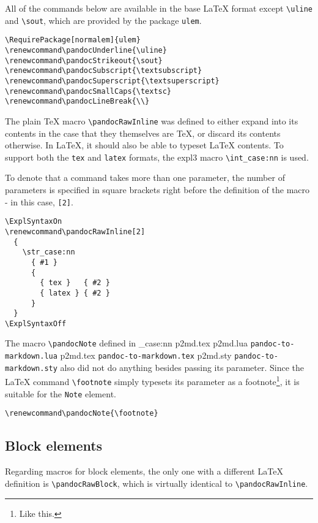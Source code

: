 \documentclass[
  digital,     %
  oneside,     %
  nosansbold,  %
  nocolorbold, %
  lof,         %
  nolot,       %
]{fithesis4}
\newcommand\macro[1]{\texttt{\textbackslash{}{#1}}}
\newcommand\file[1]
  {
    \str_case:nn
      { #1 }
      {
        { p2md.lua } { \texttt{pandoc\hyp{}to\hyp{}markdown.lua} }
        { p2md.tex } { \texttt{pandoc\hyp{}to\hyp{}markdown.tex} }
        { p2md.sty } { \texttt{pandoc\hyp{}to\hyp{}markdown.sty} }
      }
  }
\begin{document}
All of the commands below are available in the base \LaTeX{} format except \macro{uline} and \macro{sout}, which are provided by the package \texttt{ulem}.

\noindent
\lstset{language=[LaTeX]TeX}
\begin{lstlisting}
\RequirePackage[normalem]{ulem}
\renewcommand\pandocUnderline{\uline}
\renewcommand\pandocStrikeout{\sout}
\renewcommand\pandocSubscript{\textsubscript}
\renewcommand\pandocSuperscript{\textsuperscript}
\renewcommand\pandocSmallCaps{\textsc}
\renewcommand\pandocLineBreak{\\}
\end{lstlisting}

\noindent
The plain \TeX{} macro \macro{pandocRawInline} was defined to either expand into its contents in the case that they themselves are \TeX{}, or discard its contents otherwise. In \LaTeX{}, it should also be able to typeset \LaTeX{} contents. To support both the \texttt{tex} and \texttt{latex} formats, the expl3 macro \macro{int\_case:nn} is used.

To denote that a command takes more than one parameter, the number of parameters is specified in square brackets right before the definition of the macro - in this case, \texttt{[2]}.

\noindent
\lstset{language=[LaTeX]TeX}
\begin{lstlisting}
\ExplSyntaxOn
\renewcommand\pandocRawInline[2]
  {
    \str_case:nn
      { #1 }
      {
        { tex }   { #2 }
        { latex } { #2 }
      }
  }
\ExplSyntaxOff
\end{lstlisting}

\noindent
The macro \macro{pandocNote} defined in \file{p2md.tex} also did not do anything besides passing its parameter. Since the \LaTeX{} command \macro{footnote} simply typesets its parameter as a footnote\footnote{Like this.}, it is suitable for the \texttt{Note} element.

\noindent
\lstset{language=[LaTeX]TeX}
\begin{lstlisting}
\renewcommand\pandocNote{\footnote}
\end{lstlisting}

\subsection{Block elements}
Regarding macros for block elements, the only one with a different \LaTeX{} definition is \macro{pandocRawBlock}, which is virtually identical to \macro{pandocRawInline}.
\end{document}
